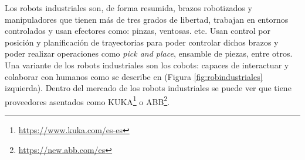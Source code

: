 Los robots industriales son, de forma resumida, brazos robotizados y manipuladores que tienen más de tres grados de libertad, trabajan en entornos controlados y usan efectores como: pinzas, ventosas. etc. Usan control por posición y planificación de trayectorias para poder controlar dichos brazos y poder realizar operaciones como \textit{pick and place}, ensamble de piezas, entre otros. Una variante de los robots industriales son los cobots: capaces de interactuar y colaborar con humanos como se describe en  \cite{ELZAATARI2019162} (Figura \ref{fig:robindustriales} izquierda). Dentro del mercado de los robots industriales se puede ver que tiene proveedores asentados como \acs{KUKA}\footnote{\url{https://www.kuka.com/es-es}} o \acs{ABB}\footnote{\url{https://new.abb.com/es}}.



